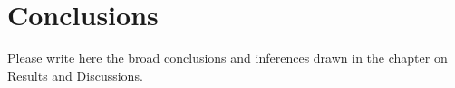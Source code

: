 \chapter{Conclusions}
Please write here the  broad conclusions and inferences drawn in the chapter on Results and Discussions. 